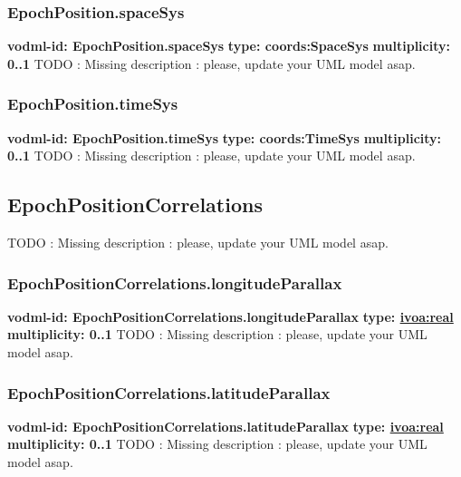     \subsubsection{EpochPosition.spaceSys}
      \textbf{vodml-id: EpochPosition.spaceSys} \newline
      \textbf{type: coords:SpaceSys} \newline
      \textbf{multiplicity: 0..1} \newline
      TODO : Missing description : please, update your UML model asap.

    \subsubsection{EpochPosition.timeSys}
      \textbf{vodml-id: EpochPosition.timeSys} \newline
      \textbf{type: coords:TimeSys} \newline
      \textbf{multiplicity: 0..1} \newline
      TODO : Missing description : please, update your UML model asap.

  \subsection{EpochPositionCorrelations}
  \label{sect:EpochPositionCorrelations}
    TODO : Missing description : please, update your UML model asap.

    \subsubsection{EpochPositionCorrelations.longitudeParallax}
      \textbf{vodml-id: EpochPositionCorrelations.longitudeParallax} \newline
      \textbf{type: \hyperref[sect:ivoa]{ivoa:real}} \newline
      \textbf{multiplicity: 0..1} \newline
      TODO : Missing description : please, update your UML model asap.

    \subsubsection{EpochPositionCorrelations.latitudeParallax}
      \textbf{vodml-id: EpochPositionCorrelations.latitudeParallax} \newline
      \textbf{type: \hyperref[sect:ivoa]{ivoa:real}} \newline
      \textbf{multiplicity: 0..1} \newline
      TODO : Missing description : please, update your UML model asap.

